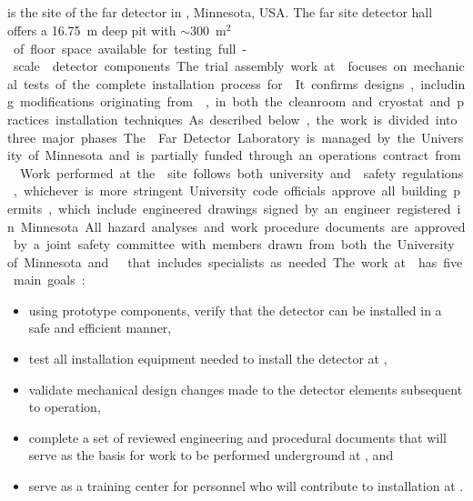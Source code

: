 \subsection{}

 is the site of the  far detector in ,
Minnesota, USA. The  far site detector hall offers a \SI{16.75}{m} 
deep pit with $\sim$\SI{300}{m$^2$} of floor space available for 
testing full-scale  detector components.  The trial assembly 
work at  focuses on mechanical tests of the complete installation
process for . It confirms designs,
including modifications originating from , 
in both the cleanroom and cryostat and practices installation techniques.  As described below, the 
work is divided into three major phases.  The  Far 
Detector Laboratory is managed by the University of Minnesota 
and is partially funded through an operations contract from 
.  Work performed at the  site follows both 
university and  safety regulations, whichever is more 
stringent. University code officials approve all building permits, 
which include engineered drawings signed by an engineer registered 
in Minnesota. All hazard analyses and work procedure documents are 
approved by a joint safety committee with members drawn from both 
the University of Minnesota and   that includes specialists 
as needed.

The work at  has five main goals:
\begin{itemize}
  \item using prototype  components, verify that the  detector can be installed 
    in a safe and efficient manner,
    \item test all installation equipment needed to install the  detector at ,
  \item validate mechanical design changes made to the detector
    elements subsequent to  operation,
  \item complete a set of reviewed engineering and procedural documents that will serve 
    as the basis for work to be performed underground at 
    , and 
  \item serve as a training center for personnel who will 
    contribute to   installation at .
\end{itemize}

